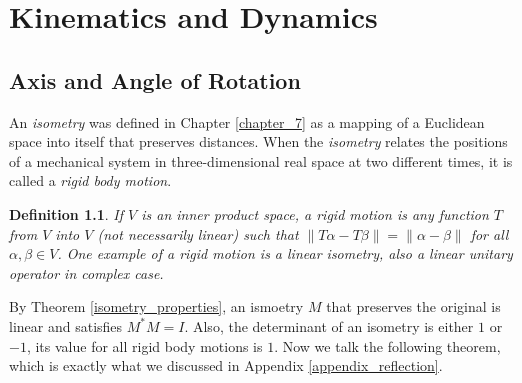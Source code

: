 \documentclass[10pt]{book}
\newtheorem{definition}{Definition}[chapter]
\theoremstyle{definition}
\numberwithin{equation}{chapter}
\begin{document}
\chapter{Kinematics and Dynamics}
\section{Axis and Angle of Rotation}

An {\em isometry} was defined in Chapter \ref{chapter_7} as a mapping of a Euclidean space into itself that preserves distances. When the {\em isometry} relates the positions of a mechanical system in three-dimensional real space at two different times, it is called a {\em rigid body motion}.

\medskip

\begin{definition}{\rm \cite{33}}
If $V$ is an inner product space, a rigid motion is any function $T$ from $V$ into $V$ (not necessarily linear) such that $\left\|T\alpha - T\beta\right\| = \left\|\alpha - \beta\right\|$ for all $\alpha, \beta \in V$. One example of a rigid motion is a linear isometry, also a linear unitary operator in complex case. 
\end{definition}

\medskip

By Theorem \ref{isometry_properties}, an ismoetry $M$ that preserves the original is linear and satisfies $M^*M = I$. Also, the determinant of an isometry is either $1$ or $-1$, its value for all rigid body motions is $1$. Now we talk the following theorem, which is exactly what we discussed in Appendix \ref{appendix_reflection}.

\medskip
\end{document}

